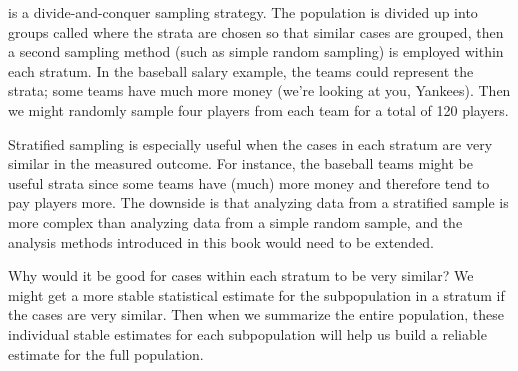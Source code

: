  is a divide-and-conquer sampling strategy. The population is divided up into groups called  where the strata are chosen so that similar cases are grouped, then a second sampling method (such as simple random sampling) is employed within each stratum. In the baseball salary example, the teams could represent the strata; some teams have much more money (we're looking at you, Yankees). Then we might randomly sample four players from each team for a total of 120 players.

Stratified sampling is especially useful when the cases in each stratum are very similar in the measured outcome. For instance, the baseball teams might be useful strata since some teams have (much) more money and therefore tend to pay players more. The downside is that analyzing data from a stratified sample is more complex than analyzing data from a simple random sample, and the analysis methods introduced in this book would need to be extended.

\begin{example}{Why would it be good for cases within each stratum to be very similar?}
We might get a more stable statistical estimate for the subpopulation in a stratum if the cases are very similar. Then when we summarize the entire population, these individual stable estimates for each subpopulation will help us build a reliable estimate for the full population.
\end{example}

